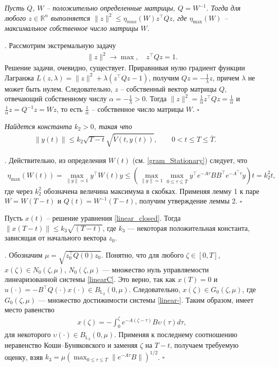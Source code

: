 \documentclass[../main.tex]{subfiles}
\begin{document}
	\begin{lemma}
		{\it Пусть $Q$, $W$ -- положительно определенные матрицы, $Q = W^{-1}$. Тогда для любого $ z \in \mathbb{R}^n $ выполняется $\| z \|^2 \leqslant \eta_{max}(W)z^{\top}Qz$,
		  где $\eta_{\max}(W) $ -- максимальное собственное число матрицы  $W$}.
	\end{lemma}
	\doc. 
	Рассмотрим экстремальную задачу 
	\begin{gather*}
	\|z\|^2 \to \max , \quad z^{\top} Q z = 1. 
	\end{gather*}
	Решение задачи, очевидно, существует. Приравнивая нулю градиент функции Лагранжа $L(z,\lambda) = \| z\|^2 + \lambda (z^{\top}Qz - 1) $, получим $Qz = -\frac{1}{\lambda}z $, причем $\lambda$ не может быть нулем.
	Следовательно, $ z $ -- собственный вектор матрицы $ Q $, отвечающий собственному числу $ \alpha = -\frac{1}{\lambda} >0  $.
	Тогда $\| z \|^2 = \frac{1}{\alpha} z^{\top} Q z = \frac{1}{\alpha}$ и $\frac{1}{\alpha}z = Q^{-1} z = W z $, то есть $\frac{1}{\alpha} $ -- собственное число матрицы $ W $.
	\hfill $\square$
	\begin{lemma}
		{\it Найдется константа $k_2>0$, такая что      \begin{gather*}
			\| y(t) \| \leqslant k_2 \sqrt{T - t} \sqrt{\widetilde{V}(t,y(t))}, \qquad 0 < t \leqslant T \leqslant \overline{T}. \qquad 
		\end{gather*}}
	\end{lemma}
	\doc.
	Действительно, из определения $W(t)$ (см. \eqref{gram_Stationary})  следует, что
	\begin{gather*}
		 \eta_{\max}(W(t)) = \max\limits_{\| y \| = 1} y^{\top} W(t) y \leqslant  \left(\max\limits_{\| y \| = 1} \max\limits_{0 \leqslant \tau  \leqslant \overline{T}} y^{\top} e^{-A\tau} B B^{\top} e^{-A^{\top}\tau} y\right)t = k_2^2 t,
	\end{gather*}
	где через $k_2^2$ обозначена величина максимума в скобках.
	Применяя лемму 1 к паре $ W  = W(T - t) $ и $ Q(t) = W^{-1}(T - t) $, получим утверждение леммы 2.
	\hfill $\square$
	\begin{lemma}\label{lem3} Пусть $x(t)$ -- решение уравнения \eqref{linear_closed}.
	Тогда $\|x(T - t) \| \leqslant k_3\sqrt{(T - t)} $, где $k_3$ --- некоторая положительная константа, зависящая  от  начального вектора $z_0$.
	 \end{lemma} 
	 \doc.
	 Обозначим $\mu=\sqrt{z_0^\top Q(0)z_0}$. 
	 Понятно, что для любого $\zeta \in [0,T]$, $x(\zeta) \in N_0(\zeta,\mu)$,   $N_0(\zeta,\mu)$ --- множество нуль управляемости линеаризованной системы \eqref{linearC}. Это верно, так как $x(T)=0$ и $u(\cdot)=-B^{\top}Q(\cdot)x(\cdot) \in B_{\mathbb{L}_2}(0,\mu)$.  
	Следовательно, $x(\zeta) \in G_0(\zeta,\mu)$, где $G_0(\zeta,\mu)$ --- множество достижимости  системы  \eqref{linear-}. Таким образом, имеет место равенство
	 \begin{gather*}
		x(\zeta)=-\int_{0}^{\zeta}e^{-A(\zeta-\tau)}B\upsilon(\tau)d\tau,  
	 \end{gather*}
	 для некоторого $\upsilon(\cdot) \in B_{\mathbb{ L}_2}(0,\mu)$. Применяя к последнему соотношению неравенство Коши--Буняковского и заменяя $\zeta$ на $T-t$, получаем требуемую оценку, взяв $k_3=\mu (\max_{0\leqslant \tau \leqslant T}\|e^{-A\tau}B\|)^{1/2}$.
	\hfill $\square$
	
\end{document}
